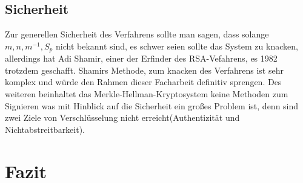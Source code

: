\documentclass[a4paper,12pt,titlepage]{article}
\begin{document}
\subsection{Sicherheit}
Zur generellen Sicherheit des Verfahrens sollte man sagen, dass solange $m, n, m^{-1}, S_p$ nicht bekannt sind, es schwer seien sollte das System zu knacken, allerdings hat Adi Shamir, einer der Erfinder des RSA-Vefahrens, es 1982 trotzdem geschafft. Shamirs Methode, zum knacken des Verfahrens ist sehr komplex und würde den Rahmen dieser Facharbeit definitiv sprengen. Des weiteren beinhaltet das Merkle-Hellman-Kryptosystem keine Methoden zum Signieren was mit Hinblick auf die Sicherheit ein großes Problem ist, denn sind zwei Ziele von Verschlüsselung nicht erreicht(Authentizität und Nichtabstreitbarkeit). %



\newpage
\section{Fazit}
\cite{delfs_knebl} \cite{oneway_lukas} \cite{asymm_gesch} \cite{martin_bio} \cite{ralph_bio} \cite{schlusselverteilung} \cite{merklehellman_neer}\cite{fa_asymm_hendrik}
\newpage


\begin{flushleft}

\end{flushleft}
\end{document}
